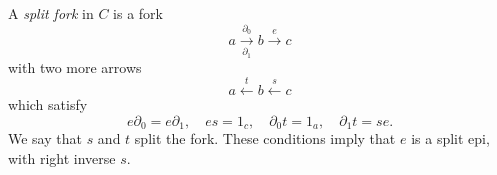 A \emph{split fork} in $C$ is a fork
$$a \xrightarrow[\partial_1]{\partial_0} b \xrightarrow{e} c$$
with two more arrows
$$a \xleftarrow{t} b \xleftarrow{s} c$$
which satisfy
$$e \partial_0 = e \partial_1, \quad e s = 1_c, \quad \partial_0 t = 1_a, \quad \partial_1 t = s e.$$
We say that $s$ and $t$ split the fork. These conditions imply that $e$ is a split epi, with right inverse $s$.
